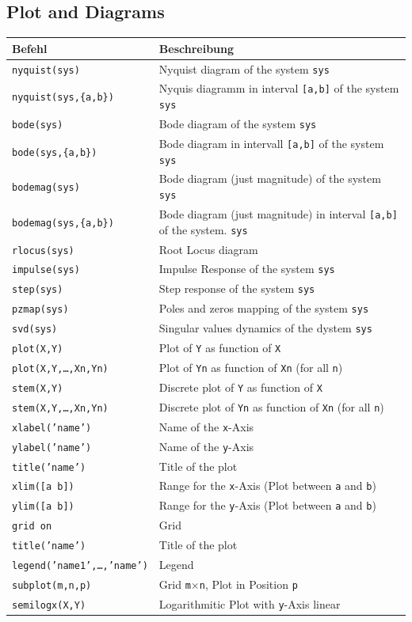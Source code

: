 \documentclass[a4paper,12 pt]{article}
\numberwithin{equation}{section}
\theoremstyle{definition}
\theoremstyle{remark}
\theoremstyle{definition}
\theoremstyle{definition}
\theoremstyle{definition}
\theoremstyle{remark}
\begin{document}
\subsection{Plot and Diagrams}
\begin{center}\begin{tabular}{ll}
\toprule
Befehl & Beschreibung \\
\midrule
\texttt{nyquist(sys)} & Nyquist diagram of the system \texttt{sys} \\
\texttt{nyquist(sys,\{a,b\})} & Nyquis diagramm in interval \texttt{[a,b]} of the system \texttt{sys}\\
\texttt{bode(sys)} & Bode diagram of the system \texttt{sys}\\
\texttt{bode(sys,\{a,b\})} & Bode diagram in intervall \texttt{[a,b]} of the system \texttt{sys}\\
\texttt{bodemag(sys)} & Bode diagram (just magnitude) of the system \texttt{sys}\\
\texttt{bodemag(sys,\{a,b\})} & Bode diagram (just magnitude) in interval \texttt{[a,b]} of the system.  \texttt{sys}\\
\texttt{rlocus(sys)} & Root Locus diagram\\
\texttt{impulse(sys)} & Impulse Response of the system \texttt{sys}\\
\texttt{step(sys)} & Step response of the system \texttt{sys}\\
\texttt{pzmap(sys)} & Poles and zeros mapping of the  system \texttt{sys} \\
\texttt{svd(sys)} & Singular values dynamics of the dystem \texttt{sys} \\
\texttt{plot(X,Y)} & Plot of \texttt{Y} as function of \texttt{X} \\
\texttt{plot(X,Y,\ldots,Xn,Yn)} & Plot of \texttt{Yn} as function of \texttt{Xn} (for all \texttt{n})\\
\texttt{stem(X,Y)} & Discrete plot of \texttt{Y} as function of \texttt{X} \\
\texttt{stem(X,Y,\ldots,Xn,Yn)} & Discrete plot of \texttt{Yn} as function of \texttt{Xn} (for all \texttt{n}) \\
\texttt{xlabel('name')} & Name of the \texttt{x}-Axis \\
\texttt{ylabel('name')} & Name of the \texttt{y}-Axis \\
\texttt{title('name')} & Title of the plot\\
\texttt{xlim([a b])} & Range for the \texttt{x}-Axis (Plot between \texttt{a} and \texttt{b}) \\
\texttt{ylim([a b])} & Range for the \texttt{y}-Axis (Plot between \texttt{a} and \texttt{b}) \\
\texttt{grid on} & Grid \\
\texttt{title('name')} & Title of the plot \\
\texttt{legend('name1',\ldots,'name')} & Legend \\
\texttt{subplot(m,n,p)} & Grid \texttt{m$\times$n}, Plot in Position \texttt{p} \\
\texttt{semilogx(X,Y)} & Logarithmitic Plot with \texttt{y}-Axis linear \\
\bottomrule
\end{tabular}\end{center}
\end{document}
